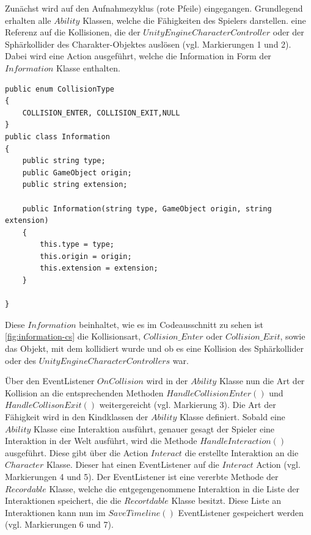 Zunächst wird auf den Aufnahmezyklus (rote Pfeile) eingegangen. Grundlegend erhalten alle $Ability$ Klassen, welche die Fähigkeiten des Spielers darstellen. eine Referenz auf die Kollisionen, die der $UnityEngine CharacterController$ oder der Sphärkollider des Charakter-Objektes auslösen (vgl. Markierungen 1 und 2). Dabei wird eine Action ausgeführt, welche die Information in Form der $Information$ Klasse enthalten.

\begin{lstlisting}[caption={Information.cs Klasse}, label={fig:information-cs}]
public enum CollisionType
{
    COLLISION_ENTER, COLLISION_EXIT,NULL
}
public class Information
{
    public string type;
    public GameObject origin;
    public string extension;

    public Information(string type, GameObject origin, string extension)
    {
        this.type = type;
        this.origin = origin;
        this.extension = extension;
    }

}
\end{lstlisting}

Diese $Information$ beinhaltet, wie es im Codeausschnitt zu sehen ist \ref{fig:information-cs} die Kollisionsart, $Collision\_Enter$ oder $Collision\_Exit$, sowie das Objekt, mit dem kollidiert wurde und ob es eine Kollision des Sphärkollider oder des $UnityEngine CharacterControllers$ war. 

Über den EventListener $OnCollision$ wird in der $Ability$ Klasse nun die Art der Kollision an die entsprechenden Methoden $HandleCollisionEnter()$ und $HandleCollisonExit()$ weitergereicht (vgl. Markierung 3). Die Art der Fähigkeit wird in den Kindklassen der $Ability$ Klasse definiert. Sobald eine $Ability$ Klasse eine Interaktion ausführt, genauer gesagt der Spieler eine Interaktion in der Welt ausführt, wird die Methode $HandleInteraction()$ ausgeführt. Diese gibt über die Action $Interact$ die erstellte Interaktion an die $Character$ Klasse. Dieser hat einen EventListener auf die $Interact$ Action (vgl. Markierungen 4 und 5). Der EventListener ist eine vererbte Methode der $Recordable$ Klasse, welche die entgegengenommene Interaktion in die Liste der Interaktionen speichert, die die $Recortdable$ Klasse besitzt. Diese Liste an Interaktionen kann nun im $SaveTimeline()$ EventListener gespeichert werden (vgl. Markierungen 6 und 7).


